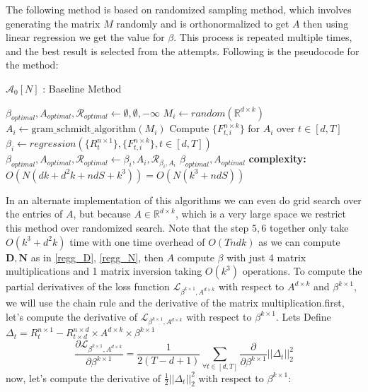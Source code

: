  The following method is based on randomized sampling method, which involves generating the matrix $M$ randomly and is orthonormalized to get $A$ then using linear regression we get the value for $\beta$. This process is repeated multiple times, and the best result is selected from the attempts.
Following is the pseudocode for the method:
\begin{algorithm}[H]
\caption{$\mathcal{A}_{0}[N]$ : Baseline Method}\label{lfm_baseline_method}
\begin{algorithmic}[1]
\State $\beta_{optimal}, A_{optimal}, \mathcal{R}_{optimal} \gets \emptyset, \emptyset, -\infty $
    \State $M_i \gets random(\mathbb{R}^{d\times k})$
    \State $A_i \gets \text{gram\_schmidt\_algorithm}(M_i)$
    \State Compute $\{F^{n\times k}_{t, i}\}$ for $A_i$ over $t\in [d,T]$
    \State $\beta_i \gets regression(\{R^{n\times 1}_{t}\},\{F^{n\times k}_{t, i}\}, t\in [d,T])$
      
        \State $\beta_{optimal}, A_{optimal}, \mathcal{R}_{optimal} \gets \beta_{i}, A_{i}, \mathcal{R}_{\beta_i, A_i} $
    \EndIf 
\EndFor
\State \Return  $\beta_{optimal}, A_{optimal}$
\State \textbf{complexity: } $O(N(dk+d^2k+ndS+k^3)) = 
 O(N(k^3+ndS))$
\end{algorithmic}
\end{algorithm} In an alternate implementation of this algorithms we can even do grid search over the entries of $A$, but because $A\in \mathbb{R}^{d\times k}$, which is a very large space we restrict this method over randomized search. Note that the step $5,6$ together only take $O(k^3+d^2k)$ time with one time overhead of $O(Tndk)$ as we can compute $\mathbf{D}, \mathbf{N}$ as in \ref{regg_D}, \ref{regg_N}, then $A$ compute $\beta$ with just 4 matrix multiplications and 1 matrix inversion taking $O(k^3)$ operations.
To compute the partial derivatives of the loss function $\mathcal{L}_{\beta^{k \times 1}, A^{d\times k}}$ with respect to $A^{d\times k}$ and $\beta^{k \times 1}$, we will use the chain rule and the derivative of the matrix multiplication.\newline \newline first, let's compute the derivative of $\mathcal{L}_{\beta^{k \times 1}, A^{d\times k}}$ with respect to $\beta^{k \times 1}$. Lets Define $\Delta_t = R^{n\times 1}_t-R^{n\times d}_{t\times d}\times A^{d\times k} \times \beta^{k \times 1}$
\begin{equation}
    \frac{\partial \mathcal{L}_{\beta^{k \times 1}, A^{d\times k}}}{\partial \beta^{k \times 1}} = \frac{1}{2(T-d+1)} \sum_{\forall t\in [d,T]} \frac{\partial}{\partial \beta^{k \times 1}} ||\Delta_t||_2^2 
\end{equation}
\newline now, let's compute the derivative of $\frac{1}{2}||\Delta_t||_2^2$ with respect to $\beta^{k\times 1}$:

